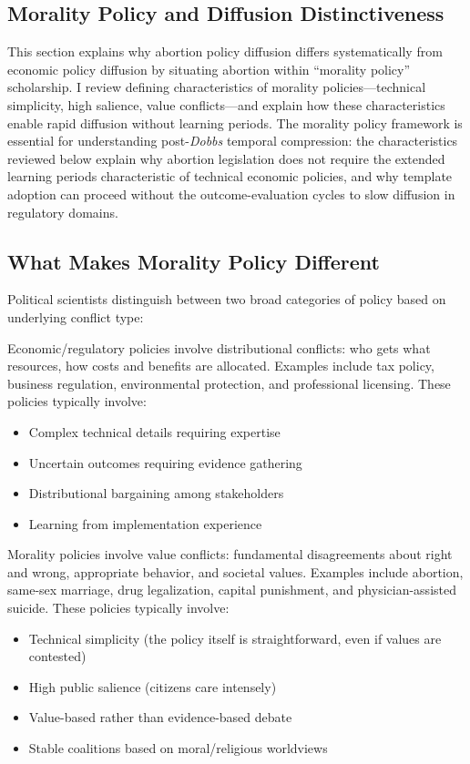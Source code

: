 \subsection{Morality Policy and Diffusion Distinctiveness}

This section explains why abortion policy diffusion differs systematically from economic policy diffusion by situating abortion within ``morality policy'' scholarship. I review defining characteristics of morality policies---technical simplicity, high salience, value conflicts---and explain how these characteristics enable rapid diffusion without learning periods. The morality policy framework is essential for understanding post-\emph{Dobbs} temporal compression: the characteristics reviewed below explain why abortion legislation does not require the extended learning periods characteristic of technical economic policies, and why template adoption can proceed without the outcome-evaluation cycles to slow diffusion in regulatory domains.

\subsection{What Makes Morality Policy Different}

Political scientists distinguish between two broad categories of policy based on underlying conflict type:

Economic/regulatory policies involve distributional conflicts: who gets what resources, how costs and benefits are allocated. Examples include tax policy, business regulation, environmental protection, and professional licensing. These policies typically involve:
\begin{itemize}
\item Complex technical details requiring expertise
\item Uncertain outcomes requiring evidence gathering
\item Distributional bargaining among stakeholders
\item Learning from implementation experience
\end{itemize}

Morality policies involve value conflicts: fundamental disagreements about right and wrong, appropriate behavior, and societal values. Examples include abortion, same-sex marriage, drug legalization, capital punishment, and physician-assisted suicide. These policies typically involve:
\begin{itemize}
\item Technical simplicity (the policy itself is straightforward, even if values are contested)
\item High public salience (citizens care intensely)
\item Value-based rather than evidence-based debate
\item Stable coalitions based on moral/religious worldviews
\end{itemize}

